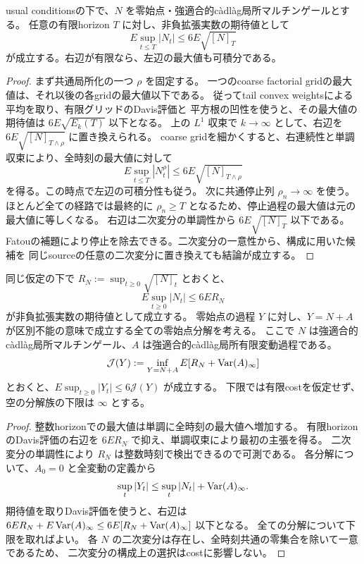 \begin{lemma}[一般の局所マルチンゲールのDavis評価]
usual conditionsの下で、$N$ を零始点・強適合的c\`adl\`ag局所マルチンゲールとする。
任意の有限horizon $T$ に対し、非負拡張実数の期待値として
\[
 E\sup_{t\le T}|N_t|\le6E\sqrt{[N]_T}
\]
が成立する。右辺が有限なら、左辺の最大値も可積分である。
\end{lemma}
\begin{proof}
まず共通局所化の一つ $\rho$ を固定する。
一つのcoarse factorial gridの最大値は、それ以後の各gridの最大値以下である。
従ってtail convex weightsによる平均を取り、有限グリッドのDavis評価と
平方根の凹性を使うと、その最大値の期待値は $6E\sqrt{E_k(T)}$ 以下となる。
上の $L^1$ 収束で $k\to\infty$ として、右辺を
$6E\sqrt{[N]_{T\wedge\rho}}$ に置き換えられる。
coarse gridを細かくすると、右連続性と単調収束により、全時刻の最大値に対して
\[
 E\sup_{t\le T}|N^\rho_t|\le6E\sqrt{[N]_{T\wedge\rho}}
\]
を得る。この時点で左辺の可積分性も従う。
次に共通停止列 $\rho_n\to\infty$ を使う。
ほとんど全ての経路では最終的に $\rho_n\ge T$ となるため、停止過程の最大値は元の最大値に等しくなる。
右辺は二次変分の単調性から $6E\sqrt{[N]_T}$ 以下である。
Fatouの補題により停止を除去できる。二次変分の一意性から、構成に用いた候補を
同じsourceの任意の二次変分に置き換えても結論が成立する。
\end{proof}

\begin{lemma}[無限horizonと全分解上の最大値評価]
同じ仮定の下で $R_N:=\sup_{t\ge0}\sqrt{[N]_t}$ とおくと、
\[
 E\sup_{t\ge0}|N_t|\le6E R_N
\]
が非負拡張実数の期待値として成立する。
零始点の過程 $Y$ に対し、$Y=N+A$ が区別不能の意味で成立する全ての零始点分解を考える。
ここで $N$ は強適合的c\`adl\`ag局所マルチンゲール、$A$ は強適合的c\`adl\`ag局所有限変動過程である。
\[
 \mathcal J(Y):=\inf_{Y=N+A}E[R_N+\operatorname{Var}(A)_\infty]
\]
とおくと、$E\sup_{t\ge0}|Y_t|\le6\mathcal J(Y)$ が成立する。
下限では有限costを仮定せず、空の分解族の下限は $\infty$ とする。
\end{lemma}
\begin{proof}
整数horizonでの最大値は単調に全時刻の最大値へ増加する。
有限horizonのDavis評価の右辺を $6E R_N$ で抑え、単調収束により最初の主張を得る。
二次変分の単調性により $R_N$ は整数時刻で検出できるので可測である。
各分解について、$A_0=0$ と全変動の定義から
\[
 \sup_t|Y_t|\le\sup_t|N_t|+\operatorname{Var}(A)_\infty.
\]
期待値を取りDavis評価を使うと、右辺は
$6E R_N+E\operatorname{Var}(A)_\infty\le6E[R_N+\operatorname{Var}(A)_\infty]$ 以下となる。
全ての分解について下限を取ればよい。
各 $N$ の二次変分は存在し、全時刻共通の零集合を除いて一意であるため、
二次変分の構成上の選択はcostに影響しない。
\end{proof}

